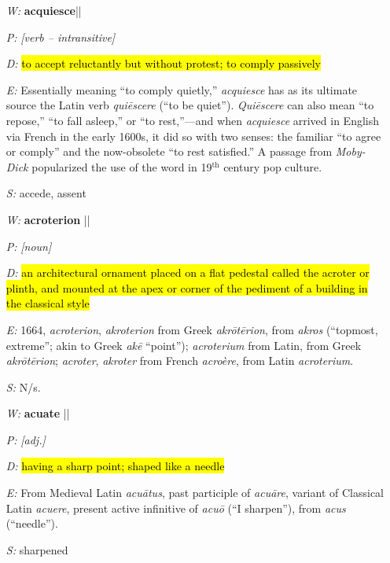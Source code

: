 \documentclass[11pt, table, dvipsnames, svgnames, x11names, xcdraw, titlepage]{article}
\begin{document}
\begin{itemize}[itemsep=0pt, topsep=0pt]
\item[\textit{W:}] \textbf{acquiesce}\quad || \quad {}
\item[\textit{P:}] \textit{[verb – intransitive]}
\item[\textit{D:}] \hl{to accept reluctantly but without protest; to comply passively}
\item[\textit{E:}] Essentially meaning ``to comply quietly,'' \textit{acquiesce} has as its ultimate source the Latin verb \textit{qui\={e}scere} (``to be quiet''). \textit{Qui\={e}scere} can also mean ``to repose,'' ``to fall asleep,'' or ``to rest,''—and when \textit{acquiesce} arrived in English via French in the early 1600s, it did so with two senses: the familiar ``to agree or comply'' and the now-obsolete ``to rest satisfied.'' A passage from \textit{Moby-Dick} popularized the use of the word in 19$^{\text{th}}$ century pop culture.
\item[\textit{S:}] accede, assent
\end{itemize}

\null

\begin{itemize}[itemsep=0pt, topsep=0pt]
\item[\textit{W:}] \textbf{acroterion} \quad || \quad {}
\item[\textit{P:}] \textit{[noun]}
\item[\textit{D:}] \hl{an architectural ornament placed on a flat pedestal called the acroter or plinth, and mounted at the apex or corner of the pediment of a building in the classical style}
\item[\textit{E:}] 1664, \textit{acroterion}, \textit{akroterion} from Greek \textit{akr\={o}t\={e}rion}, from \textit{akros} (``topmost, extreme''; akin to Greek \textit{ak\={e}} ``point''); \textit{acroterium} from Latin, from Greek \textit{akr\={o}t\={e}rion}; \textit{acroter}, \textit{akroter} from French \textit{acro\`{e}re}, from Latin \textit{acroterium}.
\item[\textit{S:}] N/s.
\end{itemize}

\null

\begin{itemize}[itemsep=0pt, topsep=0pt]
\item[\textit{W:}] \textbf{acuate} \quad || \quad {}
\item[\textit{P:}] \textit{[adj.]}
\item[\textit{D:}] \hl{having a sharp point; shaped like a needle}
\item[\textit{E:}] From Medieval Latin \textit{acu\={a}tus}, past participle of \textit{acu\={a}re}, variant of Classical Latin \textit{acuere}, present active infinitive of \textit{acu\={o}} (``I sharpen''), from \textit{acus} (``needle'').
\item[\textit{S:}] sharpened
\end{itemize}
\end{document}
